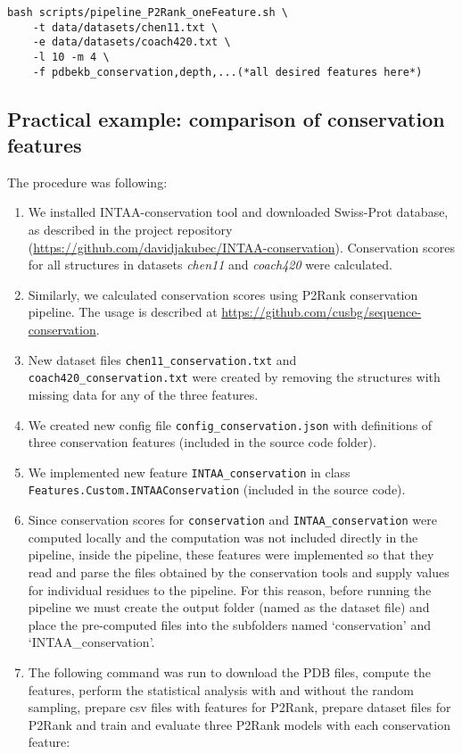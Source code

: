 \documentclass[12pt,a4paper]{report}
\begin{document}
\begin{Verbatim}[fontsize=\small]
bash scripts/pipeline_P2Rank_oneFeature.sh \
	-t data/datasets/chen11.txt \
	-e data/datasets/coach420.txt \
	-l 10 -m 4 \
	-f pdbekb_conservation,depth,...(*all desired features here*)
\end{Verbatim}

\subsection{Practical example: comparison of conservation features} \label{a:experiments4}

The procedure was following:
\begin{enumerate}
\item We installed INTAA-conservation tool and downloaded Swiss-Prot \newline database, as described in the project repository (\url{https://github.com/davidjakubec/INTAA-conservation}). Conservation scores for all structures in datasets \textit{chen11} and \textit{coach420} were calculated.
\item Similarly, we calculated conservation scores using P2Rank conservation pipeline. The usage is described at \newline \url{https://github.com/cusbg/sequence-conservation}.
\item New dataset files \texttt{chen11\_conservation.txt} and \newline \texttt{coach420\_conservation.txt} were created by removing the structures with missing data for any of the three features.
\item We created new config file \texttt{config\_conservation.json} with definitions of three conservation features (included in the source code folder).
\item We implemented new feature \texttt{INTAA\_conservation} in class \newline \texttt{Features.Custom.INTAAConservation} (included in the source code).
\item Since conservation scores for \texttt{conservation} and \texttt{INTAA\_conservation} were computed locally and the computation was not included directly in the pipeline, inside the pipeline, these features were implemented so that they read and parse the files obtained by the conservation tools and supply values for individual residues to the pipeline. For this reason, before running the pipeline we must create the output folder (named as the dataset file) and place the pre-computed files into the subfolders named `conservation' and `INTAA\_conservation'.
\item The following command was run to download the PDB files, compute the features, perform the statistical analysis with and without the random sampling, prepare csv files with features for P2Rank, prepare dataset files for P2Rank and train and evaluate three P2Rank models with each conservation feature:


\end{enumerate}
\end{document}
